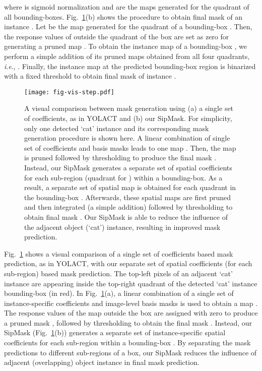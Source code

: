\documentclass[runningheads]{llncs}
\newcommand{\ie}{\textit{i}.\textit{e}.}
\begin{document}
where  is sigmoid  normalization and  are the maps generated for the   quadrant of all  bounding-boxes. Fig.~\ref{fig:step}(b) shows the procedure to obtain final mask of an instance . 
Let  be the map generated for the  quadrant of a bounding-box . Then, the response values of  outside the  quadrant of the box   are set as zero for generating a pruned map . To obtain the instance map  of a bounding-box , we  perform a simple addition of its pruned maps obtained  from all four quadrants, \ie, . Finally, the instance map at the  predicted bounding-box region is binarized with a fixed threshold to obtain final mask  of instance . 


\begin{figure}[t!]
\centering
\texttt{[image: fig-vis-step.pdf]} \caption{A visual comparison between mask generation using (a) a single set of coefficients, as in YOLACT and (b) our SipMask. For simplicity, only one detected `cat' instance and its corresponding mask generation procedure is shown here. A linear combination of single set of coefficients and basis masks leads to one map . Then, the map  is pruned followed by thresholding to produce the final mask . Instead, our SipMask generates a separate set of spatial coefficients for each sub-region (quadrant for ) within a bounding-box. As a result, a separate set of spatial map  is obtained for each quadrant  in the bounding-box . Afterwards, these spatial maps are first pruned and then integrated (a simple addition) followed by thresholding to obtain final mask . Our SipMask is able to reduce the influence of the adjacent object (`cat') instance, resulting in improved mask prediction.}\label{fig:step} 
\end{figure}

Fig.~\ref{fig:step} shows a visual comparison of a single set of coefficients based mask prediction, as in YOLACT, with our separate set of spatial coefficients (for each sub-region) based mask prediction. The top-left pixels of an adjacent `cat' instance are appearing inside the top-right quadrant of the detected `cat' instance bounding-box (in red).
In Fig.~\ref{fig:step}(a), a linear combination of a single set of instance-specific coefficients  and image-level basis masks is used to obtain a map . The response values of the map  outside the box  are assigned with zero to produce a pruned mask , followed by thresholding to obtain the final mask . 
Instead, our SipMask (Fig.~\ref{fig:step}(b)) generates a separate set of instance-specific spatial coefficients for each sub-region  within a bounding-box .  
By separating the mask predictions to different sub-regions of a box, our SipMask reduces the influence of adjacent (overlapping) object instance in final mask prediction.  
\end{document}
